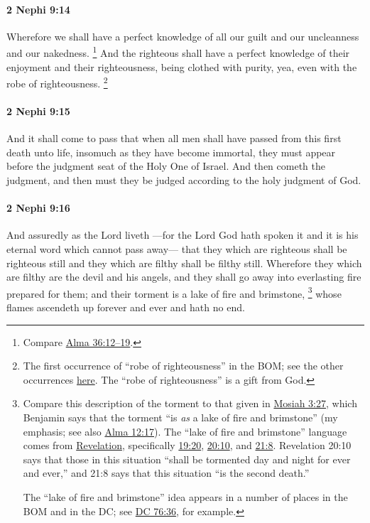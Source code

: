 		\paragraph{2 Nephi 9:14} %
			\label{2NEPHI-9-14}

			Wherefore we shall have a perfect knowledge of all our guilt
			and our uncleanness and our nakedness.%
				\footnote{%
					Compare \hyperref[ALMA-36-12]{Alma 36:12--19}.
					}
			And the righteous shall have a perfect knowledge
			of their enjoyment and their righteousness,
			being clothed with purity,
			yea, even with the robe of righteousness.%
				\footnote{%
					\label{2NEPHI-9-14-robe}%
					The first occurrence of ``robe of righteousness'' in the BOM; see the other occurrences \hyperref[RIGHTEOUSNESS-PHRASES]{here}. The ``robe of righteousness'' is a gift from God.
					}

		\paragraph{2 Nephi 9:15} %
			\label{2NEPHI-9-15}

			And it shall come to pass that
			when all men shall have passed from this first death unto life,
			insomuch as they have become immortal,
			they must appear before the judgment seat of the Holy One of Israel.
			And then cometh the judgment,
			and then must they be judged according to the holy judgment of God.

		\paragraph{2 Nephi 9:16} %
			\label{2NEPHI-9-16}

			And assuredly as the Lord liveth
			---for the Lord God hath spoken it
			and it is his eternal word which cannot pass away---
			that they which are righteous shall be righteous still
			and they which are filthy shall be filthy still.
			Wherefore they which are filthy are the devil and his angels,
			and they shall go away into everlasting fire prepared for them;
			and their torment is a lake of fire and brimstone,%
				\footnote{%
					\label{2NEPHI-9-16-lake}%
					Compare this description of the torment to that given in \hyperref[MOSIAH-3-27]{Mosiah 3:27}, which Benjamin says that the torment ``is \textit{as} a lake of fire and brimstone'' (my emphasis; see also \hyperref[ALMA-12-17]{Alma 12:17}). The ``lake of fire and brimstone'' language comes from \hyperref[REVELATIONNT]{Revelation}, specifically \hyperref[REVELATIONNT-19-20]{19:20}, \hyperref[REVELATIONNT-20-10]{20:10}, and \hyperref[REVELATIONNT-21-8]{21:8}. Revelation 20:10 says that those in this situation ``shall be tormented day and night for ever and ever,'' and 21:8 says that this situation ``is the second death.''
					
					The ``lake of fire and brimstone'' idea appears in a number of places in the BOM and in the DC; see \hyperref[DC76-36]{DC 76:36}, for example.
					}
			whose flames ascendeth up forever and ever and hath no end.

